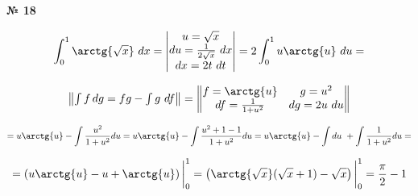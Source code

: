 \documentclass{article}
\begin{document}
\textbf{№ 18} 
\large

$$ \int_{0}^{1} \arctg{\sqrt{x}} \ dx 
= \begin{vmatrix} u = \sqrt{x} \\
                 du = \frac{1}{2\sqrt{x}} \ dx \\
                 dx = 2t \ dt \end{vmatrix} 
= 2 \int_{0}^{1} u \arctg{u} \ du 
= $$

$$ \begin{Vmatrix} \int f \,dg = fg - \int g \ df \end{Vmatrix} =
   \begin{Vmatrix} f = \arctg{u} & g = u^2 \\
                  df = \frac{1}{1+u^2}  & dg = 2u \ du \end{Vmatrix} $$

$$ = u \arctg{u} - \int \frac{u^2}{1+u^2}du
= u \arctg{u} - \int \frac{u^2+1-1}{1+u^2}du
= u \arctg{u} - \int du \ + \int \frac{1}{1+u^2}du
= $$

$$ = \left( u \arctg{u} - u + \arctg{u} \right) \bigg\vert_{0}^{1}
= \left( \arctg{\sqrt{x}}(\sqrt{x}+1) - \sqrt{x} \right) \bigg\vert_{0}^{1} 
= \frac{\pi}{2} - 1 $$
\end{document}
